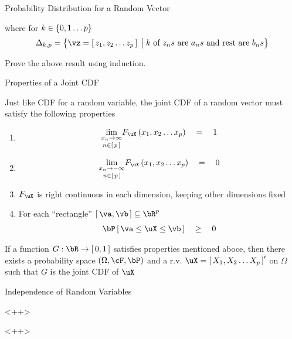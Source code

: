 \documentclass{article}
\begin{document}
\begin{ssection}{Probability Distribution for a Random Vector}
\begin{result}
		where for $k \in \left\{ {0, 1 \dots p} \right\}$
		\begin{align*}
			\Delta_{k, p} = \set{\vz = \brac{z_1, z_2 \dots z_p} \pipe k \qmt{of} z_ns \qmt{are} a_ns \qmt{and rest are} b_ns}
		\end{align*}
	\end{result}

	\begin{exercise}
		Prove the above result using induction.
	\end{exercise}

	\begin{ssubsection}{Properties of a Joint CDF}

		Just like CDF for a random variable, the joint CDF of a random vector must satisfy the following properties

		\begin{enumerate}[label=(\roman*)]
			\item
				\begin{align*}
					\underset{n \in \brac{p}}{\lim_{x_n \ra \infty}} F_\uX\para{x_1, x_2 \dots x_p}	\eq	1
				\end{align*}
			\item
				\begin{align*}
					\underset{n \in \brac{p}}{\lim_{x_n \ra -\infty}} F_\uX\para{x_1, x_2 \dots x_p}	\eq	0
				\end{align*}
			\item $F_\uX$ is right continuous in each dimension, keeping other dimensions fixed
			\item For each ``rectangle'' $\brac{\va, \vb} \subseteq \bR^p$
				\begin{align*}
					\prob{\va \le \uX \le \vb}	\qge 0
				\end{align*}
		\end{enumerate}

	\end{ssubsection}

	If a function $G : \bR \ra \brac{0, 1}$ satisfies properties mentioned aboce, then there exists a probability space $\para{\Omega, \cF, \bP}$ and a r.v. $\uX = \brac{X_1, X_2 \dots X_p}'$ on $\Omega$ such that $G$ is the joint CDF of $\uX$

\end{ssection}

\begin{ssection}{Independence of Random Variables}

	<++>

\end{ssection}<++>
\end{document}
